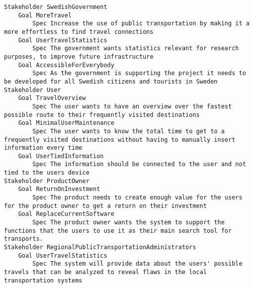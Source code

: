 

\begin{lstlisting}
Stakeholder SwedishGovernment
	Goal MoreTravel
		Spec Increase the use of public transportation by making it a more effortless to find travel connections
	Goal UserTravelStatistics
		Spec The government wants statistics relevant for research purposes, to improve future infrastructure
	Goal AccessibleForEverybody
		Spec As the government is supporting the project it needs to be developed for all Swedish citizens and tourists in Sweden
Stakeholder User
	Goal TravelOverview
		Spec The user wants to have an overview over the fastest possible route to their frequently visited destinations
	Goal MinimalUserMaintenance
		Spec The user wants to know the total time to get to a frequently visited destinations without having to manually insert information every time
	Goal UserTiedInformation
		Spec The information should be connected to the user and not tied to the users device
Stakeholder ProductOwner
	Goal ReturnOnInvestment
		Spec The product needs to create enough value for the users for the product owner to get a return on their investment
	Goal ReplaceCurrentSoftware
		Spec The product owner wants the system to support the functions that the users to use it as their main search tool for transports.
Stakeholder RegionalPublicTransportationAdministrators
	Goal UserTravelStatistics
		Spec The system will provide data about the users' possible travels that can be analyzed to reveal flaws in the local transportation systems

\end{lstlisting}